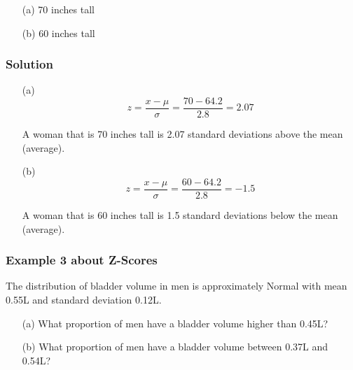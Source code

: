 \begin{enumerate}
    \item[(a)] 70 inches tall
    \item[(b)] 60 inches tall
\end{enumerate}

\subsubsection*{Solution}
\begin{enumerate}
    \item[(a)] 
\[
z = \frac{x - \mu}{\sigma} = \frac{70 - 64.2}{2.8} = 2.07
\]

A woman that is 70 inches tall is 2.07 standard deviations above the mean (average).

    \item[(b)] \[
z = \frac{x - \mu}{\sigma} = \frac{60 - 64.2}{2.8} = -1.5
\]

A woman that is 60 inches tall is 1.5 standard deviations below the mean (average).

\end{enumerate}

\subsubsection*{Example 3 about Z-Scores}
The distribution of bladder volume in men is approximately Normal with mean 0.55L and standard deviation 0.12L.

\begin{enumerate}
    \item[(a)] What proportion of men have a bladder volume higher than 0.45L?
    \item[(b)] What proportion of men have a bladder volume between 0.37L and 0.54L?
\end{enumerate}

